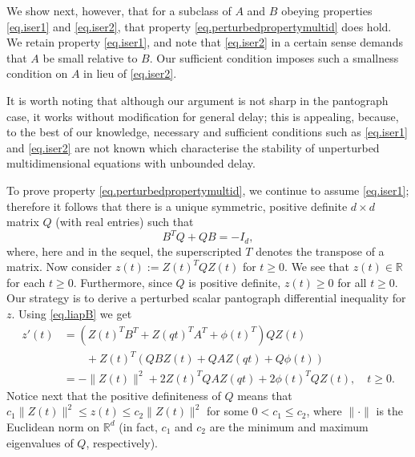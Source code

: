 \documentclass[a4paper,10pt,reqno]{amsart}
\numberwithin{equation}{section}
\theoremstyle{definition}
\theoremstyle{remark}
\DeclareMathOperator{\1}{\mathbbm 1}
\begin{document}
We show next, however, that for a subclass of $A$ and $B$ obeying properties \eqref{eq.iser1} and \eqref{eq.iser2}, that property \eqref{eq.perturbedpropertymultid} does hold. We retain property \eqref{eq.iser1}, and note that \eqref{eq.iser2} in a certain sense demands that $A$ be small relative to $B$. Our sufficient condition imposes such a smallness condition on $A$ in lieu of \eqref{eq.iser2}. 

It is worth noting that although our argument is not sharp in the pantograph case, it works without modification for general delay; this is appealing, because, to the best of our knowledge, necessary and sufficient conditions such as \eqref{eq.iser1} and \eqref{eq.iser2} are not known which characterise the stability of unperturbed multidimensional equations with unbounded delay. 

To prove property \eqref{eq.perturbedpropertymultid}, we continue to assume \eqref{eq.iser1}; therefore  it follows that there is a unique symmetric, positive definite $d\times d$ matrix $Q$ (with real entries) such that 
\begin{equation} \label{eq.liapB}
B^TQ+QB=-I_d,
\end{equation}
where, here and in the sequel, the superscripted $T$ denotes the transpose of a matrix. Now consider $z(t):=Z(t)^TQZ(t)$ for $t\geq 0$. We see that $z(t)\in \mathbb{R}$ for each $t\geq 0$. Furthermore, since $Q$ is positive definite, $z(t)\geq 0$ for all $t\geq 0$. Our strategy is to derive a perturbed scalar pantograph differential inequality for $z$. Using \eqref{eq.liapB} we get 
\begin{align}
z'(t)%
&=(Z(t)^TB^T+Z(qt)^TA^T+\phi(t)^T)QZ(t)
\nonumber\\
&\qquad+Z(t)^T  (QBZ(t)+QAZ(qt)+Q\phi(t))\nonumber\\
\label{eq.zDDEmaster}
&=-\|Z(t)\|^2+2Z(t)^TQAZ(qt) +2\phi(t)^TQZ(t), \quad t\geq 0.
\end{align}
Notice next that the positive definiteness of $Q$ means that 
$c_1\|Z(t)\|^2\leq z(t)\leq c_2\|Z(t)\|^2$ for some $0<c_1\leq c_2$, where $\|\cdot\|$ is the Euclidean norm on $\mathbb{R}^d$ (in fact, $c_1$ and $c_2$ are the minimum and maximum eigenvalues of $Q$, respectively).
\end{document}
